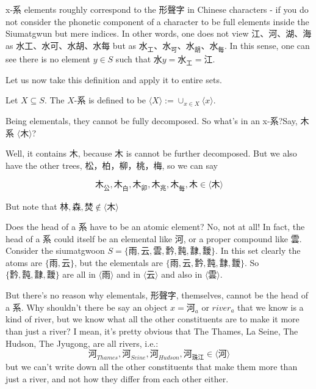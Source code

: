     x-系 elements roughly correspond to the 形聲字 in Chinese characters - if you do not consider the phonetic component of a character to be full elements inside the Siumatgwun but mere indices. In other words, one does not view 江、河、湖、海 as 水工、水可、水胡、水每 but as $\text{水}_\text{工}、\text{水}_\text{可}、\text{水}_\text{胡}、\text{水}_\text{每}$. In this sense, one can see there is no element $y \in S$ such that $\text{水}y=\text{水}_\text{工}=\text{江}$.
    
    
    Let us now take this definition and apply it to entire sets. 
    
    \begin{definition}[X-系]\label{def:hais-of-sets}
        Let $X\subseteq S$. The $X$-系 is defined to be $\langle X \rangle := \cup_{x\in X} \langle x \rangle$.
    \end{definition}
    
Being elementals, they cannot be fully decomposed. So what's in an x-系?Say, 木系 $\langle \text{木} \rangle$?

Well, it contains $\text{木}$, because $\text{木}$ is cannot be further decomposed. But we also have the other trees, 松，柏，柳，桃，梅, so we can say 

$$\text{木}_{\text{公}},\text{木}_{\text{白}},\text{木}_{\text{卯}},\text{木}_{\text{兆}},\text{木}_{\text{每}},  \text{木} \in \langle \text{木} \rangle$$



But note that $\text{林}, \text{森},  \text{焚} \not\in \langle \text{木} \rangle$


Does the head of a 系 have to be an atomic element? No, not at all! In fact, the head of a 系 could itself be an elemental like 河, or a proper compound like 雲. Consider the siumatgwoon $S = \{\text{雨}, \text{云}, \text{雲}, \text{霒}, \text{霕}, \text{霴}, \text{靉}\}$. In this set clearly the atoms are $\{\text{雨}, \text{云}\}$, but the elementals are $\{\text{雨}, \text{云}, \text{霒}, \text{霕}, \text{霴}, \text{靉}\}$. So $\{\text{霒}, \text{霕}, \text{霴}, \text{靉}\}$ are all in $\langle \text{雨} \rangle$ and in $\langle \text{云} \rangle$ and also in $\langle \text{雲} \rangle$.

But there's no reason why elementals, 形聲字, themselves, cannot be the head of a 系. Why shouldn't there be say an object $x=\text{河}_{a}$ or $river_{a}$ that we know is a kind of river, but we know what all the other constituents are to make it more than just a river? I mean, it's pretty obvious that The Thames, La Seine, The Hudson, The Jyugong, are all rivers, i.e.: 
$$\text{河}_{Thames},\text{河}_{Seine},\text{河}_{Hudson},\text{河}_{\text{珠江}} \in \langle \text{河} \rangle$$
but we can't write down all the other constituents that make them more than just a river, and not how they differ from each other either.

